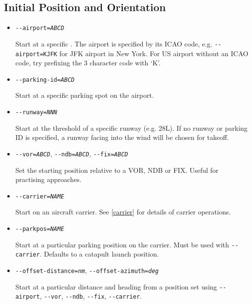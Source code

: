 \subsection{Initial Position and Orientation\label{aiportid}}
\begin{itemize}
\item{\texttt{-$ $-airport={\it ABCD}}}

Start at a specific . The airport is specified by its ICAO code, e.g. \texttt{-$ $-airport=KJFK} for
JFK airport in New York. For US airport without an ICAO code, try prefixing the 3 character code
with `K'.

\item{\texttt{-$ $-parking-id={\it ABCD}}}

Start at a specific parking spot on the airport.

\item{\texttt{-$ $-runway={\it NNN}}}

Start at the threshold of a specific runway (e.g. 28L). If no runway or parking ID is
specified, a runway facing into the wind will be chosen for takeoff.

\item{\texttt{-$ $-vor={\it ABCD}}, \texttt{-$ $-ndb={\it ABCD}}, \texttt{-$ $-fix={\it ABCD}}}

Set the starting position relative to a VOR, NDB or FIX. Useful for practising approaches.

\item{\texttt{-$ $-carrier={\it NAME}}}

Start on an aircraft carrier. See \ref{carrier} for details of carrier operations.

\item{\texttt{-$ $-parkpos={\it NAME}}}

Start at a particular parking position on the carrier. Must be used with \texttt{-$ $-carrier}.
Defaults to a catapult launch position.

\item{\texttt{-$ $-offset-distance={\it nm}}, \texttt{-$ $-offset-azimuth={\it deg}}}

Start at a particular distance and heading from a position set using \texttt{-$ $-airport},
\texttt{-$ $-vor}, \texttt{-$ $-ndb}, \texttt{-$ $-fix}, \texttt{-$ $-carrier}.


\end{itemize}
